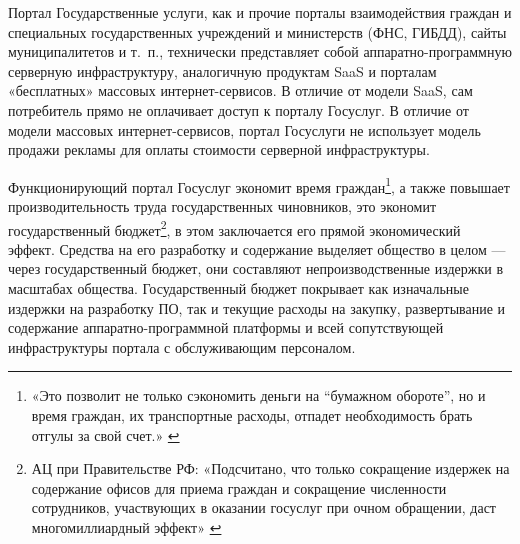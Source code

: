 \documentclass{article}
\begin{document}
Портал Государственные услуги, как и прочие порталы взаимодействия граждан и специальных государственных учреждений и министерств (ФНС, ГИБДД), сайты муниципалитетов и т.~п., технически представляет собой аппаратно-программную серверную инфраструктуру, аналогичную продуктам SaaS и порталам «бесплатных» массовых интернет-сервисов. В отличие от модели SaaS, сам потребитель прямо не оплачивает доступ к порталу Госуслуг. В отличие от модели массовых интернет-сервисов, портал Госуслуги не использует модель продажи рекламы для оплаты стоимости серверной инфраструктуры.

Функционирующий портал Госуслуг экономит время граждан\footnote{«Это позволит не только сэкономить деньги на “бумажном обороте”, но и время граждан, их транспортные расходы, отпадет необходимость брать отгулы за свой счет.» \cite{gosuslugiLaunch2009}}, а также повышает производительность труда государственных чиновников, это экономит государственный бюджет\footnote{АЦ при Правительстве РФ: «Подсчитано, что только сокращение издержек на содержание офисов для приема граждан и сокращение численности сотрудников, участвующих в оказании госуслуг при очном обращении, даст многомиллиардный эффект» \cite{gosuslugiCutExpenses2021}}, в этом заключается его прямой экономический эффект. Средства на его разработку и содержание выделяет общество в целом — через государственный бюджет, они составляют непроизводственные издержки в масштабах общества. Государственный бюджет покрывает как изначальные издержки на разработку ПО, так и текущие расходы на закупку, развертывание и содержание аппаратно-программной платформы и всей сопутствующей инфраструктуры портала с обслуживающим персоналом.
\end{document}
